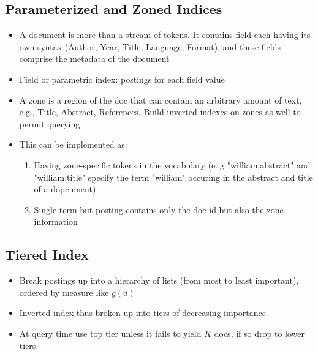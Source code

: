 \documentclass{article}
\begin{document}
\subsection{Parameterized and Zoned Indices}
\begin{itemize}
    \item A document is more than a stream of tokens. It contains field each having its own syntax (Author, Year, Title, Language, Format), and these fields comprise the metadata of the document
    
    \item Field or parametric index: postings for each field value
    
    \item A zone is a region of the doc that can contain an arbitrary amount of text, e.g., Title, Abstract, References. Build inverted indexes on zones as well to permit querying
    
    \item This can be implemented as:
    \begin{enumerate}
        \item Having zone-specific tokens in the vocabulary (e..g "william.abstract" and "william.title" specify the term "william" occuring in the abstract and title of a dopcument)
        
        \item Single term but posting contains only the doc id but also the zone information
    \end{enumerate}
\end{itemize}

\subsection{Tiered Index}
\begin{itemize}
    \item Break postings up into a hierarchy of lists (from most to least important), ordered by measure like $g(d)$
    
    \item Inverted index thus broken up into tiers of decreasing importance

    \item At query time use top tier unless it fails to yield $K$ docs, if so drop to lower tiers
\end{itemize}
\end{document}
